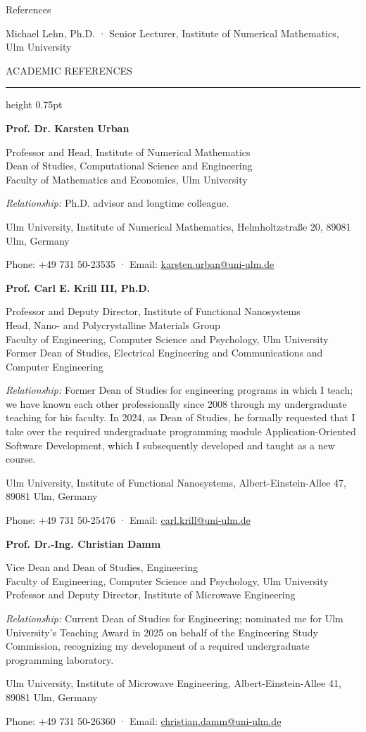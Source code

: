 \documentclass[10pt]{article}
\newcommand{\namesize}{\fontsize{16pt}{19.5pt}\selectfont}
\newcommand{\headsize}{\fontsize{10.5pt}{12.8pt}\selectfont}
\newcommand{\bodysize}{\fontsize{10.5pt}{13.6pt}\selectfont}
\newcommand{\smallsize}{\fontsize{9.5pt}{11.6pt}\selectfont}
\newcommand{\cvsection}[1]{%
  \par\vspace{8pt}%
  {\headsize\bfseries\color{heading}\strut#1\par}%
  \nopagebreak\vspace{1pt}%
  {\color{rule}\hrule height 0.75pt}%
  \nopagebreak\vspace{3pt}%
  \prevdepth=2.9pt\relax
}
\newcommand{\reference}[6]{%
  \par\vspace{14pt}%
  {\headsize\bfseries #1\par}\vspace{2pt}%
  #2\par\vspace{4pt}%
  \textit{Relationship:} #3\par\vspace{4pt}%
  {\smallsize #4\par\vspace{2pt}%
   Phone: #5 · Email: \href{mailto:#6}{#6}\par}%
}
\begin{document}
\bodysize
\raggedright
{}
\frenchspacing

{\centering
  {\namesize\bfseries\color{heading}\strut References\par}\vspace{2pt}
  {\headsize\color{tagline}Michael Lehn, Ph.D. · Senior Lecturer, Institute of Numerical Mathematics, Ulm University\par}
}

\cvsection{ACADEMIC REFERENCES}

\reference{Prof. Dr. Karsten Urban}
  {Professor and Head, Institute of Numerical Mathematics\\
   Dean of Studies, Computational Science and Engineering\\
   Faculty of Mathematics and Economics, Ulm University}
  {Ph.D. advisor and longtime colleague.}
  {Ulm University, Institute of Numerical Mathematics, Helmholtzstraße 20, 89081 Ulm, Germany}
  {+49 731 50-23535}
  {karsten.urban@uni-ulm.de}

\reference{Prof. Carl E. Krill III, Ph.D.}
  {Professor and Deputy Director, Institute of Functional Nanosystems\\
   Head, Nano- and Polycrystalline Materials Group\\
   Faculty of Engineering, Computer Science and Psychology, Ulm University\\
   Former Dean of Studies, Electrical Engineering and Communications and Computer Engineering}
  {Former Dean of Studies for engineering programs in which I teach; we have known each other professionally since 2008 through my undergraduate teaching for his faculty. In 2024, as Dean of Studies, he formally requested that I take over the required undergraduate programming module Application-Oriented Software Development, which I subsequently developed and taught as a new course.}
  {Ulm University, Institute of Functional Nanosystems, Albert-Einstein-Allee 47, 89081 Ulm, Germany}
  {+49 731 50-25476}
  {carl.krill@uni-ulm.de}

\reference{Prof. Dr.-Ing. Christian Damm}
  {Vice Dean and Dean of Studies, Engineering\\
   Faculty of Engineering, Computer Science and Psychology, Ulm University\\
   Professor and Deputy Director, Institute of Microwave Engineering}
  {Current Dean of Studies for Engineering; nominated me for Ulm University's Teaching Award in 2025 on behalf of the Engineering Study Commission, recognizing my development of a required undergraduate programming laboratory.}
  {Ulm University, Institute of Microwave Engineering, Albert-Einstein-Allee 41, 89081 Ulm, Germany}
  {+49 731 50-26360}
  {christian.damm@uni-ulm.de}
\end{document}

